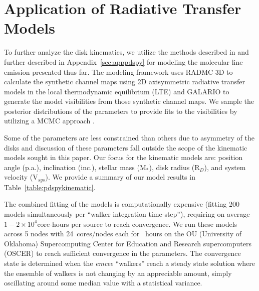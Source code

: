 \documentclass[twocolumn, 12pt, trackchanges]{aastex63}
\begin{document}
\section{Application of Radiative Transfer Models}\label{sec:kmodelresults}
To further analyze the disk kinematics, we utilize the methods described in \citet{2019ApJ...874..136S} and further described in Appendix~\ref{sec:apppdspy} for modeling the molecular line emission presented thus far. The modeling framework uses RADMC-3D \citep{2012ascl.soft02015D} to calculate the synthetic channel maps using 2D axisymmetric radiative transfer models in the local thermodynamic equilibrium (LTE)  and GALARIO \citep{2018MNRAS.476.4527T} to generate the model visibilities from those synthetic channel maps. We sample the posterior distributions of the parameters to provide fits to the visibilities by utilizing a MCMC approach  \citep[\pdspy{}; ][]{2019ApJ...874..136S}. 

Some of the parameters are less constrained than others due to asymmetry of the disks and discussion of these parameters fall outside the scope of the kinematic models sought in this paper. Our focus for the kinematic models are: position angle (p.a.), inclination (inc.), stellar mass (M$_{*}$), disk radius (R$_D$), and system velocity (V$_{sys}$). We provide a summary of our model results in Table~\ref{table:pdspykinematic}. 

The combined fitting of the models is computationally expensive (fitting 200 models simultaneously per ``walker integration time-step''), requiring on average $1-2\times10^{4}$\space core-hours per source to reach convergence. We run these models across 5 nodes with 24~cores/nodes each for ~hours on the OU (University of Oklahoma) Supercomputing Center for Education and Research supercomputers (OSCER) to reach sufficient convergence in the parameters. The convergence state is determined when the \textit{emcee} ``walkers'' reach a steady state solution where the ensemble of walkers is not changing by an appreciable amount, simply oscillating around some median value with a statistical variance.
\end{document}
